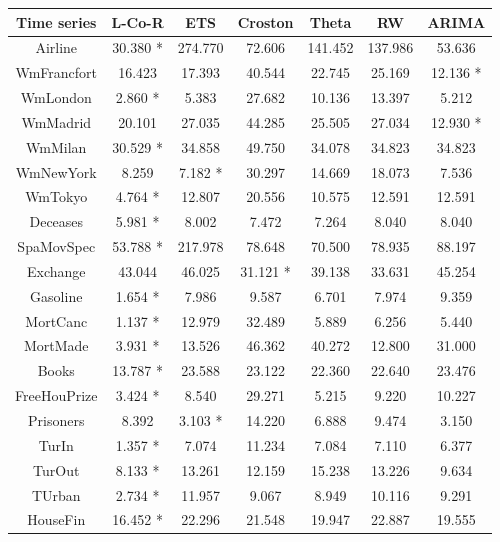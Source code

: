 \documentclass[a4paper,twoside]{article}
\newcommand{\metodo}{L-Co-R}
\begin{document}
\begin{table*}[h]
\caption{Results of the methods {\metodo}, ETS, Croston, Theta, RW, and ARIMA, with respect to MAPE. Best result per database is marked with character *.}
\label{tab:resultsMAPE}
\centering
\begin{tabular}{|c|c|c|c|c|c|c|}
  \hline
  Time series & {\metodo} & ETS & Croston & Theta & RW & ARIMA \\
  \hline Airline	&	30.380 *	&	274.770	&	72.606	&	141.452	&	137.986	&	53.636\\
  \hline WmFrancfort	&	16.423	&	17.393	&	40.544	&	22.745	&	25.169	&	12.136 *\\
  \hline WmLondon	&	2.860 *	&	5.383	&	27.682	&	10.136	&	13.397	&	5.212\\
  \hline WmMadrid	&	20.101	&	27.035	&	44.285	&	25.505	&	27.034	&	12.930 *\\
  \hline WmMilan	&	30.529 *	&	34.858	&	49.750	&	34.078	&	34.823	&	34.823\\
  \hline WmNewYork	&	8.259	&	7.182 *	&	30.297	&	14.669	&	18.073	&	7.536\\
  \hline WmTokyo	&	4.764 *	&	12.807	&	20.556	&	10.575	&	12.591	&	12.591\\
  \hline Deceases	&	5.981 *	&	8.002	&	7.472	&	7.264	&	8.040	&	8.040\\
  \hline SpaMovSpec	&	53.788 *	&	217.978	&	78.648	&	70.500	&	78.935	&	88.197\\
  \hline Exchange	&   43.044	&   46.025	&   31.121 *	&   39.138	&   33.631	&   45.254\\
  \hline Gasoline	&	1.654 *	&	7.986	&	9.587	&	6.701	&	7.974	&	9.359\\
  \hline MortCanc	&	1.137 *	&	12.979	&	32.489	&	5.889	&	6.256	&	5.440\\
  \hline MortMade	&	3.931 *	&	13.526	&	46.362	&	40.272	&	12.800	&	31.000\\
  \hline Books	&	13.787 *	&	23.588	&	23.122	&	22.360	&	22.640	&	23.476\\
  \hline FreeHouPrize	&	3.424 *	&	8.540	&	29.271	&	5.215	&	9.220	&	10.227\\
  \hline Prisoners	&   8.392	&   3.103 *	&   14.220	&   6.888	&   9.474   &	3.150\\
  \hline TurIn	&	1.357 *	&	7.074	&	11.234	&	7.084	&	7.110	&	6.377\\
  \hline TurOut	&	8.133 *	&	13.261	&	12.159	&	15.238	&	13.226	&	9.634\\
  \hline TUrban	&	2.734 *	&	11.957	&	9.067	&	8.949	&	10.116	&	9.291\\
  \hline HouseFin	&	16.452 *	&	22.296	&	21.548	&	19.947	&	22.887	&	19.555\\
  \hline
\end{tabular}
\end{table*}
\end{document}
